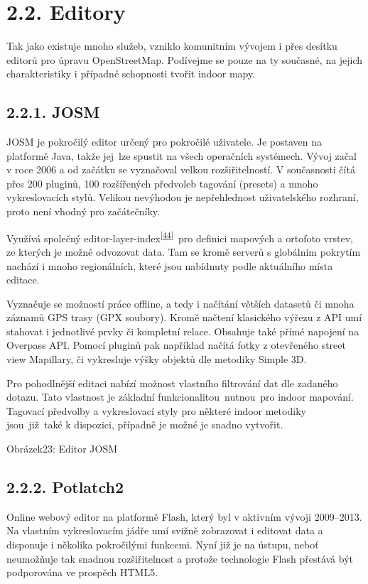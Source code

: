 \section{2.2. Editory}\label{editory}

Tak jako existuje mnoho služeb, vzniklo komunitním vývojem i přes desítku editorů pro úpravu OpenStreetMap. Podívejme se pouze na ty současné, na jejich charakteristiky i případné schopnosti tvořit indoor mapy.

\subsection{2.2.1. JOSM}\label{josm}

JOSM je pokročilý editor určený pro pokročilé uživatele. Je postaven na platformě Java, takže jej~lze spustit na všech operačních systémech. Vývoj začal v roce 2006 a od začátku se vyznačoval velkou rozšiřitelností. V současnosti čítá přes 200 pluginů, 100 rozšířených předvoleb tagování (presets) a mnoho vykreslovacích stylů. Velikou nevýhodou je nepřehlednost uživatelského rozhraní, proto není vhodný pro začátečníky.

Využívá společný editor-layer-index\textsuperscript{\href{}{{[}44{]}}}~pro definici mapových a ortofoto vrstev, ze kterých je možné odvozovat data. Tam se kromě serverů s globálním pokrytím nachází i mnoho regionálních, které jsou nabídnuty podle aktuálního místa editace.

Vyznačuje se možností práce offline, a tedy i načítání větších datasetů či mnoha záznamů GPS trasy (GPX soubory). Kromě načtení klasického výřezu z API umí stahovat i jednotlivé prvky či kompletní relace. Obsahuje také přímé napojení na Overpass API. Pomocí pluginů pak například načítá fotky z otevřeného street view Mapillary, či vykresluje výšky objektů dle metodiky Simple 3D.

Pro pohodlnější editaci nabízí možnost vlastního filtrování dat dle zadaného dotazu. Tato vlastnost je základní funkcionalitou~nutnou~pro indoor mapování. Tagovací předvolby a vykreslovací styly pro některé indoor metodiky jsou~již~také k dispozici, případně je možné je snadno vytvořit.

Obrázek23: Editor JOSM

\subsection{2.2.2. Potlatch2}\label{potlatch2}

Online webový editor na platformě Flash, který byl v aktivním vývoji 2009--2013. Na vlastním vykreslovacím jádře umí svižně zobrazovat i editovat data a disponuje i několika pokročilými funkcemi. Nyní již je na ústupu, neboť neumožňuje tak snadnou rozšiřitelnost a protože technologie Flash přestává být podporována ve prospěch HTML5.

